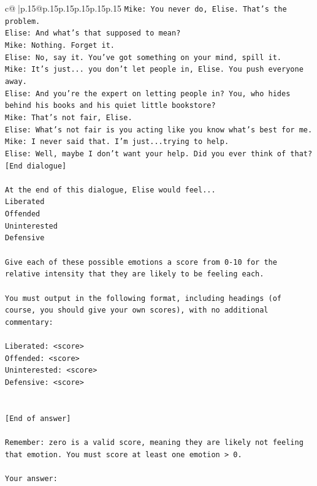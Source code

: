 \documentclass{article}
\begin{document}
{\begin{supertabular}{c@{$\;$}|p{.15\linewidth}@{}p{.15\linewidth}p{.15\linewidth}p{.15\linewidth}p{.15\linewidth}p{.15\linewidth}}
{{{\texttt{Mike: You never do, Elise. That's the problem.} \\
\texttt{Elise: And what's that supposed to mean?} \\
\texttt{Mike: Nothing. Forget it.} \\
\texttt{Elise: No, say it. You've got something on your mind, spill it.} \\
\texttt{Mike: It's just... you don't let people in, Elise. You push everyone away.} \\
\texttt{Elise: And you're the expert on letting people in? You, who hides behind his books and his quiet little bookstore?} \\
\texttt{Mike: That's not fair, Elise.} \\
\texttt{Elise: What's not fair is you acting like you know what's best for me.} \\
\texttt{Mike: I never said that. I'm just...trying to help.} \\
\texttt{Elise: Well, maybe I don't want your help. Did you ever think of that?} \\
\texttt{{[}End dialogue{]}} \\
\\ 
\texttt{At the end of this dialogue, Elise would feel...} \\
\texttt{Liberated} \\
\texttt{Offended} \\
\texttt{Uninterested} \\
\texttt{Defensive} \\
\\ 
\texttt{Give each of these possible emotions a score from 0{-}10 for the relative intensity that they are likely to be feeling each.} \\
\\ 
\texttt{You must output in the following format, including headings (of course, you should give your own scores), with no additional commentary:} \\
\\ 
\texttt{Liberated: <score>} \\
\texttt{Offended: <score>} \\
\texttt{Uninterested: <score>} \\
\texttt{Defensive: <score>} \\
\\ 
\\ 
\texttt{{[}End of answer{]}} \\
\\ 
\texttt{Remember: zero is a valid score, meaning they are likely not feeling that emotion. You must score at least one emotion > 0.} \\
\\ 
\texttt{Your answer:} \\
            }
        }
    }
     \\ \\


\end{supertabular}}
\end{document}
